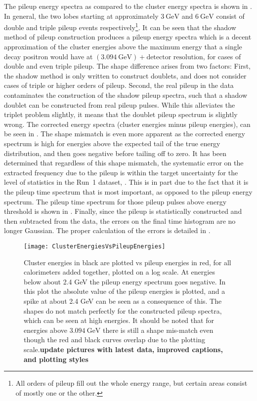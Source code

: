 The pileup energy spectra as compared to the cluster energy spectra is shown in . In general, the two lobes starting at approximately $\SI{3}{\GeV}$ and $\SI{6}{\GeV}$ consist of double and triple pileup events respectively\footnote{All orders of pileup fill out the whole energy range, but certain areas consist of mostly one or the other.}. It can be seen that the shadow method of pileup construction produces a pileup energy spectra which is a decent approximation of the cluster energies above the maximum energy that a single decay positron would have at $(\SI{3.094}{\GeV}) + \text{detector resolution}$, for cases of double and even triple pileup. The shape difference arises from two factors: First, the shadow method is only written to construct doublets, and does not consider cases of triple or higher orders of pileup. Second, the real pileup in the data contaminates the construction of the shadow pileup spectra, such that a shadow doublet can be constructed from real pileup pulses. While this alleviates the triplet problem slightly, it means that the doublet pileup spectrum is slightly wrong. The corrected energy spectra (cluster energies minus pileup energies), can be seen in . The shape mismatch is even more apparent as the corrected energy spectrum is high for energies above the expected tail of the true energy distribution, and then goes negative before tailing off to zero. It has been determined that regardless of this shape mismatch, the systematic error on the extracted \wa frequency due to the pileup is within the target uncertainty for the level of statistics in the Run~1 dataset, . This is in part due to the fact that it is the pileup time spectrum that is most important, as opposed to the pileup energy spectrum. The pileup time spectrum for those pileup pulses above energy threshold is shown in . Finally, since the pileup is statistically constructed and then subtracted from the data, the errors on the final time histogram are no longer Gaussian. The proper calculation of the errors is detailed in .


    \begin{figure}[]
        \centering
        \texttt{[image: ClusterEnergiesVsPileupEnergies]}
        \caption[Cluster energies vs pileup energies]{Cluster energies in black are plotted vs pileup energies in red, for all calorimeters added together, plotted on a log scale. At energies below about 2.4 GeV the pileup energy spectrum goes negative. In this plot the absolute value of the pileup energies is plotted, and a spike at about 2.4 GeV can be seen as a consequence of this. The shapes do not match perfectly for the constructed pileup spectra, which can be seen at high energies. It should be noted that for energies above $\SI{3.094}{\GeV}$ there is still a shape mis-match even though the red and black curves overlap due to the plotting scale.\textbf{update pictures with latest data, improved captions, and plotting styles}}    
        \label{fig:ClusterEnergiesVsPileupEnergies}
    \end{figure}


